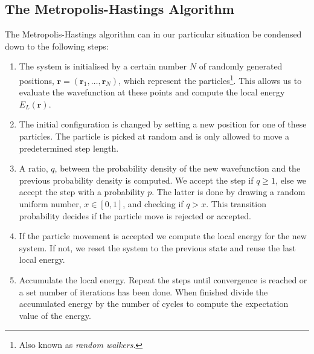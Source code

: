 \documentclass[
    a4paper, aps, twocolumn, floatfix, superscriptaddress,
    nofootinbib]{revtex4-1}
\newcommand{\vf}{\mathbf}
\newcommand{\1}{\mathds{1}}
\begin{document}
    \subsection{The Metropolis-Hastings Algorithm}
        The Metropolis-Hastings algorithm can in our particular situation be
        condensed down to the following steps:

        \begin{enumerate}
            \item The system is initialised by a certain number $N$ of randomly
                generated positions, $\vf{r} = (\vf{r}_1, \dots, \vf{r}_N)$,
                which represent the particles\footnote{Also known as
                \emph{random walkers}.}. This allows us to evaluate the
                wavefunction at these points and compute the local energy
                $E_L(\vf{r})$.

            \item The initial configuration is changed by setting a new position
                for one of these particles. The particle is picked at random and
                is only allowed to move a predetermined step length.


            \item A ratio, $q$, between the probability density of the new
                wavefunction and the previous probability density is computed.
                We accept the step if $q \geq 1$, else we accept the step with a
                probability $p$. The latter is done by drawing a random uniform
                number, $x \in [0, 1]$, and checking if $q > x$.  This
                transition probability decides if the particle move is rejected
                or accepted.

            \item If the particle movement is accepted we compute the local
                energy for the new system. If not, we reset the system to the
                previous state and reuse the last local energy.

            \item Accumulate the local energy. Repeat the steps until
                convergence is reached or a set number of iterations has been
                done. When finished divide the accumulated energy by the number
                of cycles to compute the expectation value of the energy.

        \end{enumerate}
\end{document}

